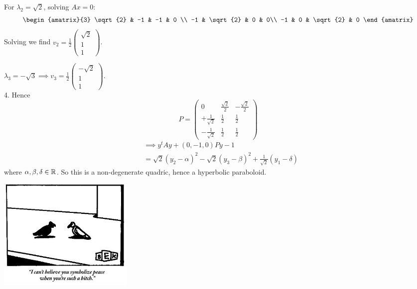 \documentclass[10pt]{scrartcl}
\begin{document}
\begin{example}
For $\lambda_2 = \sqrt{2}$, solving $Ax = 0$: 
\[
  \begin{amatrix}{3}
  	\sqrt{2} & -1 & -1 & 0 \\ 
  	-1 & \sqrt{2} & 0 & 0\\
  	-1 & 0 & \sqrt{2} & 0 
  \end{amatrix}
\]
Solving we find $v_2 = \frac{1}{2}\begin{pmatrix}
\sqrt{2} \\ 1 \\ 1	
\end{pmatrix}$.

$\lambda_3 = -\sqrt{3} \implies v_3 = \frac{1}{2}\begin{pmatrix}
-\sqrt{2} \\ 1 \\ 1	
\end{pmatrix}$.\\


4. Hence 
\[
  P = \begin{pmatrix}
 0 & \frac{\sqrt{2}}{2} & - \frac{\sqrt{2}}{2}\\[.1cm]
 +\frac{1}{\sqrt{2}} & \frac{1}{2} & \frac{1}{2}\\[.1cm]
 -\frac{1}{\sqrt{2}} & \frac{1}{2} & \frac{1}{2}	
 \end{pmatrix}
\]
\begin{align*}
  &\implies y^tAy + (0,-1,0)Py -1\\
  &= \sqrt{2}(y_2-\alpha)^2 - \sqrt{2}(y_3 - \beta)^2+ \frac{1}{\sqrt{2}}(y_1 - \delta)
\end{align*}
where $\alpha,\beta,\delta \in\mathbb{R}$. So this is a non-degenerate quadric, hence a hyperbolic paraboloid. 
\end{example}




\begin{center}
\includegraphics[width=6.5cm]{cartoon5.jpg}	
\end{center}
\end{document}
